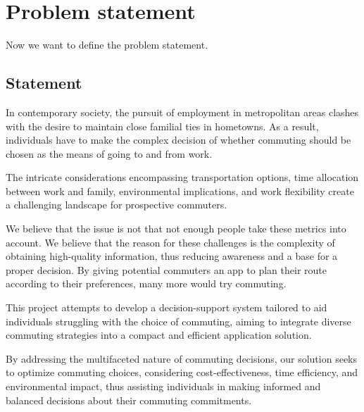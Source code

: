 \chapter{Problem statement}\label{ch:problem-statement}

Now we want to define the problem statement.


\section{Statement}\label{sec:statement}

In contemporary society, the pursuit of employment in metropolitan areas clashes with the desire to maintain close
familial ties in hometowns.
As a result, individuals have to make the complex decision of whether commuting should be chosen as the means of
going to and from work.

The intricate considerations encompassing transportation options, time allocation between work and family, environmental
implications, and work flexibility create a challenging landscape for prospective commuters.

We believe that the issue is not that not enough people take these metrics into account.
We believe that the reason for these challenges is the complexity of obtaining high-quality information, thus reducing
awareness and a base for a proper decision.
By giving potential commuters an app to plan their route according to their preferences, many more would try commuting.

This project attempts to develop a decision-support system tailored to aid individuals struggling with the choice of
commuting, aiming to integrate diverse commuting strategies into a compact and efficient application solution.

By addressing the multifaceted nature of commuting decisions, our solution seeks to optimize commuting choices,
considering cost-effectiveness, time efficiency, and environmental impact, thus assisting individuals in making
informed and balanced decisions about their commuting commitments.
